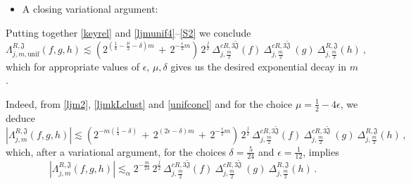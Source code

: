 \documentclass[a4paper,reqno]{amsart}
\numberwithin{equation}{section}
\theoremstyle{definition}
\def\beq{\begin{equation}}
\def\eeq{\end{equation}}
\def\beq{\begin{equation}}
\def\eeq{\end{equation}}
\def\a{\alpha}
\def\beq{\begin{equation}}
\def\eeq{\end{equation}}
\def\beq{\begin{equation}}
\def\eeq{\end{equation}}
\def\d{\delta}
\def\ep{\epsilon}
\def\L{\Lambda}
\begin{document}
\begin{itemize}
\item  A closing variational argument:
\end{itemize}

Putting together \eqref{keyrel} and \eqref{ljmunif4}--\eqref{S2} we conclude
\beq\label{unifconcl}
\L_{j,m,\text{unif}}^{R,\mathfrak{J}}(f,g,h)\lesssim (2^{(\frac{1}{4}-\frac{\mu}{2}-\d)m}\,+\, 2^{-\frac{\ep}{2} m})\, 2^{\frac{j}{2}}\,\Delta_{j,\frac{m}{2}}^{c R, 3\tilde{\mathfrak{J}}}\!(f)\: \Delta_{j,\frac{m}{2}}^{c R,3\tilde{\mathfrak{J}}}\:\!(g)\: \Delta_{j,\frac{m}{2}}^{R,\mathfrak{J}} (h)\:,
\eeq
which for appropriate values of $\ep,\,\mu,\d$ gives us the desired exponential decay in $m$.

Indeed, from \eqref{ljm2}, \eqref{ljmkLclust} and \eqref{unifconcl} and for the choice $\mu=\frac{1}{2}-4\ep$, we deduce
\beq\label{CRUX}
|\L_{j,m}^{R,\mathfrak{J}}(f,g,h)|\lesssim  (2^{-m(\frac{1}{4}-\d)}\,+\,2^{(2\ep-\d)m}\,+\, 2^{-\frac{\ep}{2} m})\,2^{\frac{j}{2}}\,\Delta_{j,\frac{m}{2}}^{c R, 3\tilde{\mathfrak{J}}}\!(f)\: \Delta_{j,\frac{m}{2}}^{c R,3\tilde{\mathfrak{J}}}\:\!(g)\:\Delta_{j,\frac{m}{2}}^{R,\mathfrak{J}} (h)\,,\quad
\eeq
which, after a variational argument, for the choices $\d=\frac{5}{24}$ and $\ep=\frac{1}{12}$, implies
\beq\label{CRUX1}
|\L_{j,m}^{R,\mathfrak{J}}(f,g,h)|\lesssim_{\a}  2^{-\frac{m}{24}}\,2^{\frac{j}{2}}\,\Delta_{j,\frac{m}{2}}^{c R, 3\tilde{\mathfrak{J}}}(f)\: \Delta_{j,\frac{m}{2}}^{c R,3\tilde{\mathfrak{J}}}\:(g)\:\Delta_{j,\frac{m}{2}}^{R,\mathfrak{J}} (h)\,.
\eeq
\end{document}

